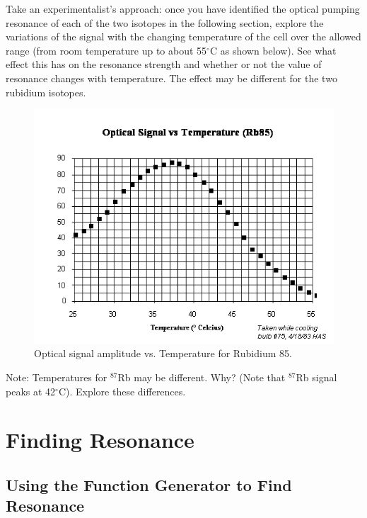 \documentclass{../lab}
\begin{document}
Take an experimentalist's approach: once you have identified the optical pumping resonance of each of the two isotopes in the following section, explore the variations of the signal with the changing temperature of the cell over the allowed range (from room temperature up to about 55$^\circ$C as shown below). See what effect this has on the resonance strength and whether or not the value of resonance changes with temperature. The effect may be different for the two rubidium isotopes.

    \begin{figure}[h]
        \centering
        \includegraphics[width=0.8\linewidth]{images/SigVsTemp}
        \caption{Optical signal amplitude vs. Temperature for Rubidium 85.}
    \end{figure}

\noindent Note: Temperatures for $^{87}$Rb may be different. Why? (Note that $^{87}$Rb signal peaks at 42$^\circ$C). Explore these differences.

\section{Finding Resonance}

\subsection{Using the Function Generator to Find Resonance}

\newpage
\end{document}
